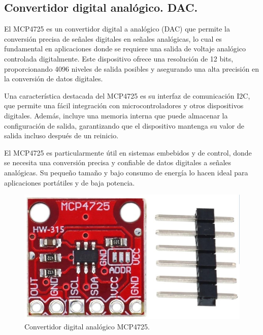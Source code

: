 \subsection{Convertidor digital analógico. DAC.}
El MCP4725\cite{MCP4725} es un convertidor digital a analógico (DAC) que permite la conversión precisa de señales digitales en señales analógicas, lo cual es fundamental en aplicaciones donde se requiere una salida de voltaje analógico controlada digitalmente. Este dispositivo ofrece una resolución de 12 bits, proporcionando 4096 niveles de salida posibles y asegurando una alta precisión en la conversión de datos digitales.\par 
Una característica destacada del MCP4725 es su interfaz de comunicación I2C, que permite una fácil integración con microcontroladores y otros dispositivos digitales. Además, incluye una memoria  interna que puede almacenar la configuración de salida, garantizando que el dispositivo mantenga su valor de salida incluso después de un reinicio.\par 
El MCP4725 es particularmente útil en sistemas embebidos y de control, donde se necesita una conversión precisa y confiable de datos digitales a señales analógicas. Su pequeño tamaño y bajo consumo de energía lo hacen ideal para aplicaciones portátiles y de baja potencia.\par 

\begin{figure}[H]
    \centering
    \includegraphics[scale=0.3]{./imagenes/mcp4725.jpg}
    \caption{Convertidor digital analógico MCP4725.}
    \label{F:DAC}
\end{figure}\par 

